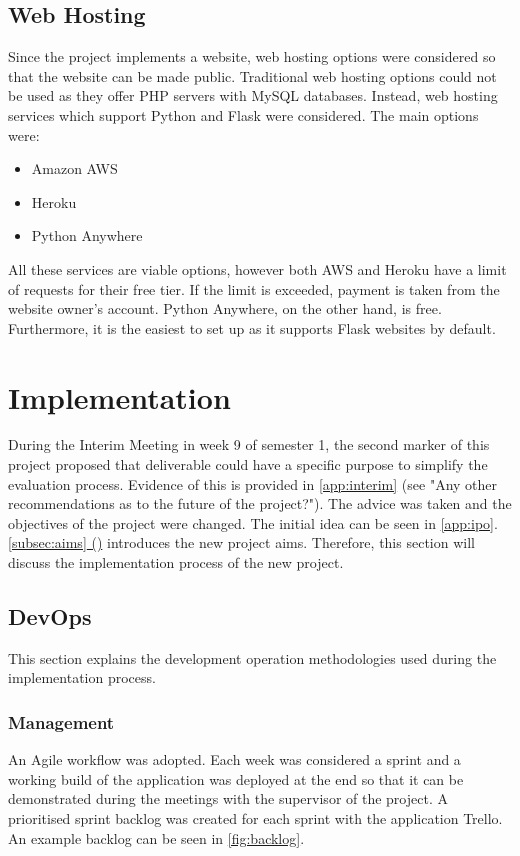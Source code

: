 \documentclass[12pt,a4paper]{article}
\newcommand*{\fullref}[1]{\hyperref[{#1}]{\cref*{#1} (\nameref*{#1})}} %
\begin{document}
\subsection{Web Hosting}
Since the project implements a website, web hosting options were considered so that the website can be made public. Traditional web hosting options could not be used as they offer PHP servers with MySQL databases. Instead, web hosting services which support Python and Flask were considered. The main options were:
\begin{itemize}
	\item Amazon AWS 
	\item Heroku
	\item Python Anywhere
\end{itemize}

All these services are viable options, however both AWS and Heroku have a limit of requests for their free tier. If the limit is exceeded, payment is taken from the website owner’s account. Python Anywhere, on the other hand, is free. Furthermore, it is the easiest to set up as it supports Flask websites by default.

\newpage
\section{Implementation}\label{sec:impl}
During the Interim Meeting in week 9 of semester 1, the second marker of this project proposed that deliverable could have a specific purpose to simplify the evaluation process. Evidence of this is provided in \cref{app:interim} (see "Any other recommendations as to the future of the project?").  The advice was taken and the objectives of the project were changed. The initial idea can be seen in \cref{app:ipo}. \fullref{subsec:aims} introduces the new project aims. Therefore, this section will discuss the implementation process of the new project.

\subsection{DevOps}
This section explains the development operation methodologies used during the implementation process.

\subsubsection{Management}
An Agile workflow was adopted. Each week was considered a sprint and a working build of the application was deployed at the end so that it can be demonstrated during the meetings with the supervisor of the project. A prioritised sprint backlog was created for each sprint with the application Trello. An example backlog can be seen in \cref{fig:backlog}.
\end{document}
